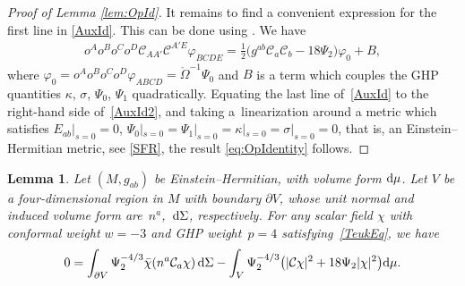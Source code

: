 \documentclass[10pt,a4paper]{amsart}
\numberwithin{equation}{section}
\newtheorem{Lemma}[Theorem]{Lemma}
\begin{document}
\begin{proof}[Proof of Lemma \ref{lem:OpId}]
It remains to find a convenient expression for the first line in \eqref{AuxId}. This can be done using \cite[equations~(3.6) and (3.15)]{araneda2018conformal}. We have
\begin{align}\label{AuxId2}
o^Ao^Bo^Co^D\mathcal{C}_{AA'}\mathcal{C}^{A'E}\varphi_{BCDE} =
\frac{1}{2} \bigl(g^{ab}\mathcal{C}_{a}\mathcal{C}_{b}-18\Psi_{2}\bigr)\varphi_{0} + B,
\end{align}
where $\varphi_{0}= o^Ao^Bo^Co^D\varphi_{ABCD}=\mathring{\Omega}^{-1}\Psi_0$ and $B$ is a term which couples the GHP quantities $\kappa$, $\sigma$, $\Psi_0$, $\Psi_1$ quadratically. Equating the last line of~\eqref{AuxId} to the right-hand side of~\eqref{AuxId2}, and taking a~linearization around a metric which satisfies $E_{ab}|_{s=0}=0$, ${\Psi_{0}|_{s=0}=\Psi_{1}|_{s=0}=\kappa|_{s=0}=\sigma|_{s=0}=0}$, that is, an Einstein--Hermitian metric, see \eqref{SFR}, the result \eqref{eq:OpIdentity} follows.
\end{proof}

\begin{Lemma}\label{lem:divergence}
Let $(M, g_{ab})$ be Einstein--Hermitian, with volume form ${\rm d}\mu$.
Let $V$ be a four-dimen\-sion\-al region in $M$ with boundary $\partial{V}$, whose unit normal and induced volume form are~$n^{a}$,~${\rm d}\Sigma$, respectively. For any scalar field $\chi$ with conformal weight $w=-3$ and GHP weight~${p=4}$ satisfying~\eqref{TeukEq}, we have
\begin{align} \label{eq:MainIdentity}
0 =
\int_{\partial{V}} \Psi_{2}^{-4/3}\bar\chi(n^a\mathcal{C}_{a}\chi) \, {\rm d}\Sigma
- \int_{V}\Psi_{2}^{-4/3}\bigl(|\mathcal{C}\chi|^{2} + 18\Psi_{2}|\chi|^2\bigr){\rm d}\mu.
\end{align}
\end{Lemma}
\end{document}

